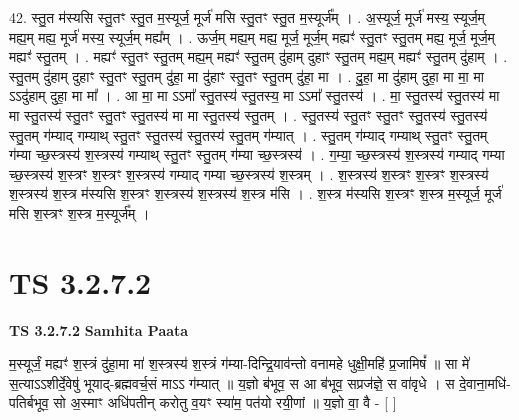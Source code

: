 \documentclass[17pt]{extarticle}
\begin{document}
42. स्तु॒त म॑स्यसि स्तु॒तꣳ स्तु॒त म॒स्यूर्ज॒ मूर्ज॑ मसि स्तु॒तꣳ स्तु॒त म॒स्यूर्ज᳚म् । . अ॒स्यूर्ज॒ मूर्ज॑ मस्य॒ स्यूर्ज॒म् मह्य॒म् मह्य॒ मूर्ज॑ मस्य॒ स्यूर्ज॒म् मह्य᳚म् । . ऊर्ज॒म् मह्य॒म् मह्य॒ मूर्ज॒ मूर्ज॒म् मह्यꣳ॑ स्तु॒तꣳ स्तु॒तम् मह्य॒ मूर्ज॒ मूर्ज॒म् मह्यꣳ॑ स्तु॒तम् । . मह्यꣳ॑ स्तु॒तꣳ स्तु॒तम् मह्य॒म् मह्यꣳ॑ स्तु॒तम् दु॑हाम् दुहाꣳ स्तु॒तम् मह्य॒म् मह्यꣳ॑ स्तु॒तम् दु॑हाम् । . स्तु॒तम् दु॑हाम् दुहाꣳ स्तु॒तꣳ स्तु॒तम् दु॑हा॒ मा दु॑हाꣳ स्तु॒तꣳ स्तु॒तम् दु॑हा॒ मा । . दु॒हा॒ मा दु॑हाम् दुहा॒ मा मा॒ मा ऽऽदु॑हाम् दुहा॒ मा मा᳚ । . आ मा॒ मा ऽऽमा᳚ स्तु॒तस्य॑ स्तु॒तस्य॒ मा ऽऽमा᳚ स्तु॒तस्य॑ । . मा॒ स्तु॒तस्य॑ स्तु॒तस्य॑ मा मा स्तु॒तस्य॑ स्तु॒तꣳ स्तु॒तꣳ स्तु॒तस्य॑ मा मा स्तु॒तस्य॑ स्तु॒तम् । . स्तु॒तस्य॑ स्तु॒तꣳ स्तु॒तꣳ स्तु॒तस्य॑ स्तु॒तस्य॑ स्तु॒तम् ग॑म्याद् गम्याथ् स्तु॒तꣳ स्तु॒तस्य॑ स्तु॒तस्य॑ स्तु॒तम् ग॑म्यात् । . स्तु॒तम् ग॑म्याद् गम्याथ् स्तु॒तꣳ स्तु॒तम् ग॑म्या च्छ॒स्त्रस्य॑ श॒स्त्रस्य॑ गम्याथ् स्तु॒तꣳ स्तु॒तम् ग॑म्या च्छ॒स्त्रस्य॑ । . ग॒म्या॒ च्छ॒स्त्रस्य॑ श॒स्त्रस्य॑ गम्याद् गम्या च्छ॒स्त्रस्य॑ श॒स्त्रꣳ श॒स्त्रꣳ श॒स्त्रस्य॑ गम्याद् गम्या च्छ॒स्त्रस्य॑ श॒स्त्रम् । . श॒स्त्रस्य॑ श॒स्त्रꣳ श॒स्त्रꣳ श॒स्त्रस्य॑ श॒स्त्रस्य॑ श॒स्त्र म॑स्यसि श॒स्त्रꣳ श॒स्त्रस्य॑ श॒स्त्रस्य॑ श॒स्त्र म॑सि । . श॒स्त्र म॑स्यसि श॒स्त्रꣳ श॒स्त्र म॒स्यूर्ज॒ मूर्ज॑ मसि श॒स्त्रꣳ श॒स्त्र म॒स्यूर्ज᳚म् । \newline
\pagebreak
{}

\section{ TS 3.2.7.2 }

\textbf{TS 3.2.7.2 } \newline
\textbf{Samhita Paata} \newline

म॒स्यूर्जं॒ मह्यꣳ॑ श॒स्त्रं दु॑हा॒मा मा॑ श॒स्त्रस्य॑ श॒स्त्रं ग॑म्या-दिन्द्रि॒याव॑न्तो वनामहे धुक्षी॒महि॑ प्र॒जामिषं᳚ ॥ सा मे॑ स॒त्याऽऽशीर्दे॒वेषु॑ भूयाद्-ब्रह्मवर्च॒सं माऽऽ ग॑म्यात् ॥ य॒ज्ञो ब॑भूव॒ स आ ब॑भूव॒ सप्रज॑ज्ञे॒ स वा॑वृधे । स दे॒वाना॒मधि॑-पतिर्बभूव॒ सो अ॒स्माꣳ अधि॑पतीन् करोतु व॒यꣳ स्या॑म॒ पत॑यो रयी॒णां ॥ य॒ज्ञो वा॒ वै - [  ] \newline
\end{document}
